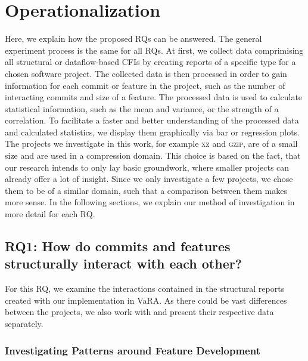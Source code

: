 \section{Operationalization}\label{sec:operationalization}

Here, we explain how the proposed RQs can be answered.
The general experiment process is the same for all RQs.
At first, we collect data comprimising all structural or dataflow-based CFIs by creating reports of a specific type for a chosen software project.
The collected data is then processed in order to gain information for each commit or feature in the project, such as the number of interacting commits and size of a feature.
The processed data is used to calculate statistical information, such as the mean and variance, or the strength of a correlation.
To facilitate a faster and better understanding of the processed data and calculated statistics, we display them graphically via bar or regression plots.
The projects we investigate in this work, for example \textsc{xz} and \textsc{gzip}, are of a small size and are used in a compression domain.
This choice is based on the fact, that our research intends to only lay basic groundwork, where smaller projects can already offer a lot of insight.
Since we only investigate a few projects, we chose them to be of a similar domain, such that a comparison between them makes more sense.
In the following sections, we explain our method of investigation in more detail for each RQ.

\subsection*{\textbf{RQ1: How do commits and features structurally interact with each other?}}

For this RQ, we examine the interactions contained in the structural reports created with our implementation in VaRA.
As there could be vast differences between the projects, we also work with and present their respective data separately.

\subsubsection*{Investigating Patterns around Feature Development}

